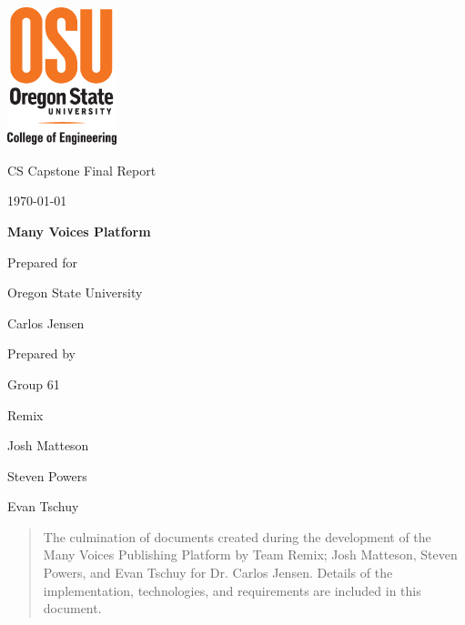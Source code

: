 \documentclass[onecolumn, draftclsnofoot,10pt, compsoc]{IEEEtran}
\def \CapstoneTeamName{		Remix}
\def \CapstoneTeamNumber{		61}
\def \GroupMemberOne{			Josh Matteson}
\def \GroupMemberTwo{			Steven Powers}
\def \GroupMemberThree{			Evan Tschuy}
\def \CapstoneProjectName{		Many Voices Platform}
\def \CapstoneSponsorCompany{	Oregon State University}
\def \CapstoneSponsorPerson{		Carlos Jensen}
\def \DocType{
	Final Report
}
\newcommand{\NameSigPair}[1]{\par
	\makebox[2.75in][r]{#1} \hfil 	\makebox[3.25in]{\makebox[2.25in]{\hrulefill} \hfill		\makebox[.75in]{\hrulefill}}
	\par\vspace{-12pt} \textit{\tiny\noindent
		\makebox[2.75in]{} \hfil		\makebox[3.25in]{\makebox[2.25in][r]{Signature} \hfill	\makebox[.75in][r]{Date}}}}
\renewcommand{\NameSigPair}[1]{#1}
\begin{document}
	
	\begin{titlepage}
		\begin{singlespace}
			\includegraphics[height=4cm]{coe_v_spot1}
			\hfill
			\par\vspace{.2in}
			\centering
			\scshape{
				\huge CS Capstone \DocType \par
				{\large\today}\par
				\vspace{.5in}
				\textbf{\Huge\CapstoneProjectName}\par
				\vfill
				{\large Prepared for}\par
				\Huge \CapstoneSponsorCompany\par
				\vspace{5pt}
				{\Large\NameSigPair{\CapstoneSponsorPerson}\par}
				{\large Prepared by }\par
				Group\CapstoneTeamNumber\par
				\CapstoneTeamName\par
				\vspace{5pt}
				{\Large
					\NameSigPair{\GroupMemberOne}\par
					\NameSigPair{\GroupMemberTwo}\par
					\NameSigPair{\GroupMemberThree}\par
				}
				\vspace{20pt}
			}
			\begin{abstract}
				\noindent The culmination of documents created during the development of the Many
				Voices Publishing Platform by Team Remix; Josh Matteson, Steven Powers, and Evan Tschuy 
				for Dr. Carlos Jensen. Details of the implementation, technologies, and requirements are
				included in this document.
			\end{abstract}
		\end{singlespace}
	\end{titlepage}
\end{document}
